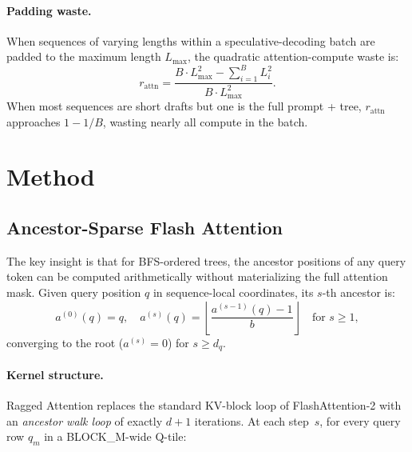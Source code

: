 \documentclass{article}
\newcommand{\method}{Ragged Attention}
\newcommand{\depth}{d}
\newcommand{\branching}{b}
\newcommand{\batchsize}{B}
\begin{document}
\paragraph{Padding waste.}
When sequences of varying lengths within a speculative-decoding batch
are padded to the maximum length $L_{\max}$, the quadratic
attention-compute waste is:
\begin{equation}\label{eq:padding-waste}
  r_{\text{attn}} = \frac{\batchsize \cdot L_{\max}^2 - \sum_{i=1}^{\batchsize} L_i^2}
  {\batchsize \cdot L_{\max}^2}.
\end{equation}
When most sequences are short drafts but one is the full prompt +
tree, $r_{\text{attn}}$ approaches $1 - 1/\batchsize$, wasting
nearly all compute in the batch.


\section{Method}\label{sec:method}

\subsection{Ancestor-Sparse Flash Attention}

The key insight is that for BFS-ordered trees, the
ancestor positions of any query token can be computed arithmetically
without materializing the full attention mask.
Given query position $q$ in sequence-local coordinates, its
$s$-th ancestor is:
\begin{equation}\label{eq:ancestor-walk}
  a^{(0)}(q) = q, \quad
  a^{(s)}(q) = \left\lfloor \frac{a^{(s-1)}(q) - 1}{\branching} \right\rfloor
  \quad \text{for } s \geq 1,
\end{equation}
converging to the root ($a^{(s)} = 0$) for $s \geq \depth_q$.

\paragraph{Kernel structure.}
\method{} replaces the standard KV-block loop of FlashAttention-2
with an \emph{ancestor walk loop} of exactly $\depth + 1$ iterations.
At each step~$s$, for every query row $q_m$ in a BLOCK\_M-wide Q-tile:
\end{document}

